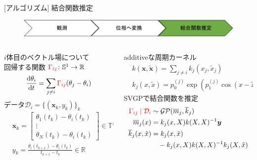 \begin{frame}[t]{[アルゴリズム] 結合関数推定}
  \begin{figure}
    \centering
    \includegraphics[width=\textwidth]{figs/flowchart3.pdf}
  \end{figure}
  \begin{columns}[t]
    \begin{column}{0.45\textwidth}
      $i$体目のベクトル場について\\
      \checkmark 回帰する関数 $\textcolor{red}{\Gamma_{ij}}\colon\mathbb{S}^{1}\to\mathbb{R}$
      \begin{align*}
        \frac{\mathrm{d}\theta_{i}}{\mathrm{d} t}=\sum_{j\ne i}\textcolor{red}{\Gamma_{ij}}(\theta_{j}-\theta_{i})
      \end{align*}
      \checkmark データ$\mathcal{D}_{i}=\{(\bm{x}_{k},y_{k})\}_{k}$
      \begin{align*}
        &\bm{x}_{k}=\begin{bmatrix}
          \theta_{1}(t_{k}) - \theta_{i}(t_{k})\\
          \vdots\\
          \theta_{N}(t_{k}) - \theta_{i}(t_{k})
        \end{bmatrix} \in \mathbb{T}^{N-1}\\
        &y_{k}=\frac{\theta_{i}(t_{k+1}) - \theta_{i}(t_{k})}{t_{k+1} - t_{k}} \in \mathbb{R}
      \end{align*}
    \end{column}
    \begin{column}{0.55\textwidth}
      \checkmark additiveな周期カーネル
      \begin{align*}
        &k(\bm{x},\tilde{\bm{x}})=\sum_{j\ne i}k_{j}(x_{j},\tilde{x}_{j})\\
        &k_{j}(x,\tilde{x})=p_{0}^{(j)}\exp(p_{1}^{(j)}\cos(x-\tilde{x}))
      \end{align*}
      \checkmark SVGPで結合関数を推定
      \begin{align*}
        \textcolor{red}{\Gamma_{ij}\mid\mathcal{D}_{i}}&\sim\mathcal{GP}(\overline{m}_{j}, \overline{k}_{j})\\
        \overline{m}_{j}(x)&=k_{j}(x,X)k(X,X)^{-1}\bm{y}\\
        \overline{k}_{j}(x,\tilde{x})&=k_{j}(x,\tilde{x})\\
        &\quad -k_{j}(x,X)k(X,X)^{-1}k_{j}(X,\tilde{x})
      \end{align*}
    \end{column}
  \end{columns}
\end{frame}

